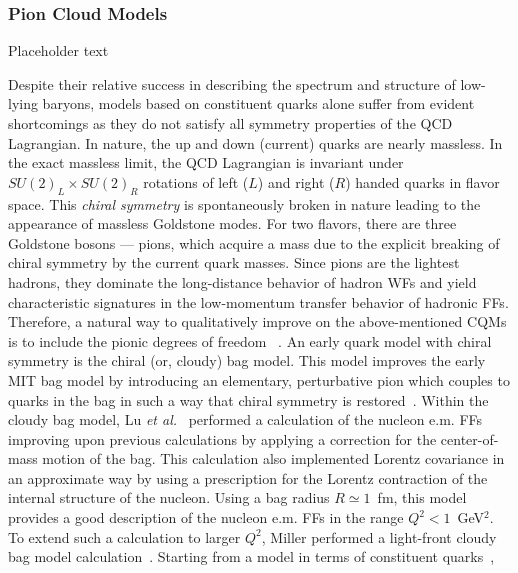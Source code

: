 \subsubsection{Pion Cloud Models}
\label{subsubsec:pion}


Placeholder text

Despite their relative success in describing the spectrum and structure of 
low-lying baryons, models based on constituent quarks alone 
suffer from evident shortcomings as they do not satisfy all symmetry 
properties of the QCD Lagrangian. In nature, the up and down (current) quarks 
are nearly massless. In the exact massless limit, the QCD Lagrangian is 
invariant under $SU(2)_L \times SU(2)_R$ rotations of left ($L$) and 
right ($R$) handed quarks in flavor space. This {\it chiral symmetry} 
is spontaneously broken in nature leading to the appearance of massless 
Goldstone modes. For two flavors, there are three Goldstone bosons ---
pions, which acquire a mass due to the explicit breaking of chiral 
symmetry by the current quark masses. 
\newline
\indent
Since pions are the lightest hadrons, they 
dominate the long-distance 
behavior of hadron WFs and yield characteristic 
signatures in the low-momentum transfer behavior of hadronic 
FFs. 
Therefore, a natural way to qualitatively improve 
on the above-mentioned CQMs is to include the pionic degrees of freedom 
~\cite{Manohar:1983md}.  
\newline
\indent
An early quark model with chiral symmetry 
is the chiral (or, cloudy) bag model. This model  
improves the early MIT bag model by introducing 
an elementary, perturbative pion which couples to quarks in the bag 
in such a way that chiral symmetry is restored~\cite{Thomas:1982kv}. 
Within the cloudy bag model, Lu {\it et al.}~\cite{lu} 
performed a calculation of the nucleon e.m. FFs 
improving upon previous calculations by 
applying a correction for the center-of-mass motion of the bag. 
This calculation also implemented Lorentz covariance in an approximate way 
by using a prescription for the Lorentz contraction of the 
internal structure of the nucleon. Using a bag radius $R \simeq 1$~fm, 
this model provides a good description of the nucleon e.m. FFs in the range 
$Q^2 < 1$~GeV$^2$.  
\newline
\indent
To extend such a calculation to larger $Q^2$, Miller performed a 
light-front cloudy bag model calculation~\cite{miller02b}. 
Starting from a model in terms of constituent quarks~\cite{miller02}, 
